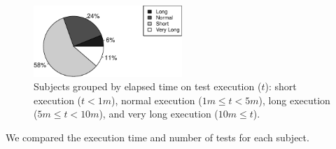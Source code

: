 \begin{figure}[h!]
    \centering
    \includegraphics[width=0.5\textwidth]{results/rq1/plots/piechart.pdf}
    \caption{\label{fig:piechart-time} Subjects grouped by elapsed
    time on test execution ($t$): short execution ($t < 1m$), normal
    execution ($1m \leq t < 5m$), long execution ($5m \leq t <
    10m$), and very long execution ($10m \leq t$).}
\end{figure}

We compared the execution time and number of tests for each subject. 

\begin{figure}[h!]%
    \centering
    \begin{minipage}{4.5in}%
        \\
    \end{minipage}
    \caption{}
\end{figure}

